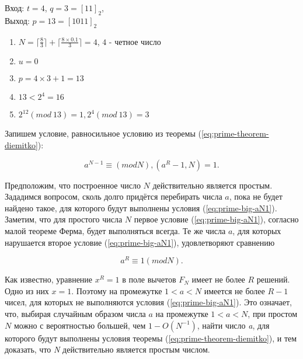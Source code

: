       \begin{example}
	Вход: {$t = 4$}, {$q = 3 = [11]_{2}$}, \\
	Выход: {$p = 13 = [1011]_{2}$}
	
	  \begin{enumerate}
	   \item {$N = \lceil \frac{8}{3} \rceil + \lceil \frac{8 \times 0.1}{3} \rceil = 4$}, {$4$} - четное число
	   \item {$u = 0$}
	   \item {$p = 4 \times 3 + 1 = 13$}
	   \item {$13 < 2^{ 4} = 16$}
	   \item {$2^{ 12}(mod \: 13) = 1, 2^{ 4}(mod \: 13) = 3$}
	  \end{enumerate}  
	
      \end{example}

  Запишем условие, равносильное условию из теоремы (\ref{eq:prime-theorem-diemitko}):
  
    \begin{equation} \label{eq:prime-big-aN1}
       a^{ N - 1} \equiv (mod N), (a^{ R} - 1, N) = 1.
    \end{equation}
      
  Предположим, что построенное число {$N$} действительно является простым. Зададимся вопросом, сколь долго придётся 
  перебирать числа {$a$}, пока не будет найдено такое, для которого будут выполнены условия (\ref{eq:prime-big-aN1}). Заметим, что для простого числа {$N$}
  первое условие (\ref{eq:prime-big-aN1}), согласно малой теореме Ферма, будет выполняться всегда. Те же числа {$a$}, для которых нарушается второе 
  условие (\ref{eq:prime-big-aN1}), удовлетворяют сравнению

  \begin{equation} \label{eq:prime-big-ar1}
   a^{ R} \equiv 1(mod N).
  \end{equation}

  Как известно, уравнение {$x^{ R} = 1$} в поле вычетов {$F_{N}$} имеет не более {$R$} решений. 
  Одно из них {$x = 1$}. Поэтому на промежутке {$1 < a < N$} имеется не более {$R - 1$} чисел, для которых не выполняются 
  условия (\ref{eq:prime-big-aN1}). Это означает, что, выбирая случайным образом числа {$a$} на промежутке {$1 < a < N$}, при простом {$N$}  
  можно с вероятностью большей, чем {$1 - O(N^{ -1})$}, найти число \textit{a}, для которого будут выполнены условия 
  теоремы (\ref{eq:prime-theorem-diemitko}), и тем доказать, что \textit{N} действительно является простым числом.

